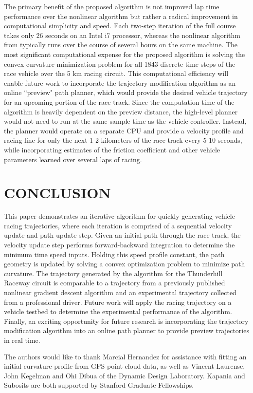 \documentclass[twocolumn,10pt, final]{asme2e}
\begin{document}
The primary benefit of the proposed algorithm is not improved lap time performance
over the nonlinear algorithm but rather a radical improvement in computational simplicity and speed. Each two-step iteration of the full
course takes only 26 seconds on an Intel i7 processor, whereas the nonlinear algorithm from \cite{theodosis} typically runs over the course of several hours on the same
machine. The most significant computational expense for the proposed algorithm is solving the convex curvature minimization problem for all 1843 discrete time steps of the race vehicle over the 5 km racing circuit.
This computational efficiency will enable future work to incorporate the trajectory modification algorithm as an online ``preview" path planner, which would 
provide the desired vehicle trajectory for an upcoming portion of the race track. Since the computation time of the
 algorithm is heavily dependent on the preview distance, the high-level planner would not need to run at the
 same sample time as the vehicle controller. Instead, the planner would operate on a separate CPU and provide a velocity profile and racing line for only
 the next 1-2 kilometers of the race track every 5-10 seconds, while incorporating estimates of the friction coefficient and other vehicle parameters learned over
 several laps of racing. 

\section*{CONCLUSION}

This paper demonstrates an iterative algorithm for quickly generating vehicle racing trajectories, where each iteration is comprised of
 a sequential velocity update and path update step. Given an initial path through the race track, the 
 velocity update step performs forward-backward integration to determine the minimum time speed inputs. Holding this speed 
 profile constant, the path geometry is updated by solving a convex optimization problem to minimize path curvature. The trajectory
 generated by the algorithm for the Thunderhill Raceway circuit is comparable to a trajectory 
 from a previously published nonlinear gradient descent algorithm and an experimental trajectory collected from a
 professional driver. Future work will apply the racing trajectory on a vehicle testbed to determine the experimental performance of the algorithm. 
 Finally, an exciting opportunity for future research is incorporating the trajectory modification algorithm into an online path planner to provide preview trajectories in real time. 




\begin{acknowledgment}
The authors would like to thank Marcial Hernandez for assistance with fitting an initial curvature profile from GPS point cloud data, as well as
Vincent Laurense, John Kegelman and Ohi Dibua of the Dynamic Design Laboratory. Kapania and Subosits are both supported by Stanford Graduate Fellowships. 
\end{acknowledgment}



\end{document}
